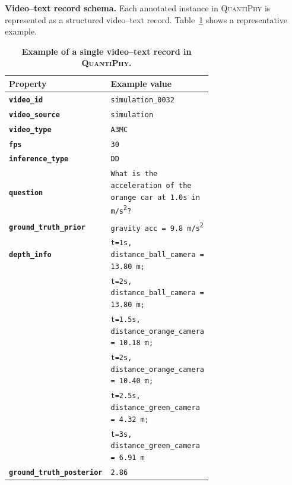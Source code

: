 \noindent\textbf{Video–text record schema.}
Each annotated instance in \textsc{QuantiPhy} is represented as a structured video–text record.
Table~\ref{tab:record-schema-example} shows a representative example.

\begin{table}[t]
\centering
\small
\renewcommand{\arraystretch}{1.1}
\begin{tabular}{l p{0.68\linewidth}}
\toprule
Property & Example value \\
\midrule
\texttt{\textbf{video\_id}} &
\texttt{simulation\_0032} \\
\texttt{\textbf{video\_source}} &
\texttt{simulation} \\
\texttt{\textbf{video\_type}} &
\texttt{A3MC} \\
\texttt{\textbf{fps}} &
\texttt{30} \\
\texttt{\textbf{inference\_type}} &
\texttt{DD} \\
\texttt{\textbf{question}} &
\texttt{What is the acceleration of the orange car at 1.0s in m/s\textsuperscript{2}?} \\
\texttt{\textbf{ground\_truth\_prior}} &
\texttt{gravity acc = 9.8 m/s\textsuperscript{2}} \\
\texttt{\textbf{depth\_info}} &
\texttt{t=1s, distance\_ball\_camera = 13.80 m;}\\[-0.2em]
&
\texttt{t=2s, distance\_ball\_camera = 13.80 m;}\\[-0.2em]
&
\texttt{t=1.5s, distance\_orange\_camera = 10.18 m;}\\[-0.2em]
&
\texttt{t=2s, distance\_orange\_camera = 10.40 m;}\\[-0.2em]
&
\texttt{t=2.5s, distance\_green\_camera = 4.32 m;}\\[-0.2em]
&
\texttt{t=3s, distance\_green\_camera = 6.91 m} \\
\texttt{\textbf{ground\_truth\_posterior}} &
\texttt{2.86} \\
\bottomrule
\end{tabular}
\caption{\textbf{Example of a single video--text record in \textsc{QuantiPhy}.}}
\label{tab:record-schema-example}
\end{table}

